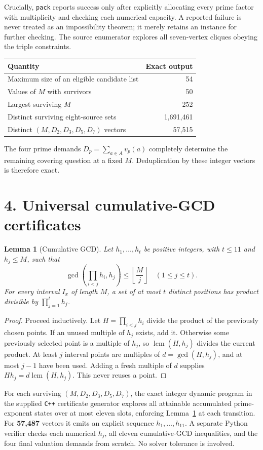 \documentclass[11pt,a4paper]{article}
\newtheorem{lemma}[theorem]{Lemma}
\newcommand{\val}{v}
\newcommand{\GG}{\operatorname{gcd}}
\begin{document}
Crucially, \texttt{pack} reports success only after explicitly allocating every prime factor with multiplicity and checking each numerical capacity. A reported failure is never treated as an impossibility theorem; it merely retains an instance for further checking. The source enumerator explores all seven-vertex cliques obeying the triple constraints.

\begin{center}\begin{tabular}{lr}\toprule
Quantity & Exact output\\\midrule
Maximum size of an eligible candidate list & 54\\
Values of $M$ with survivors & 50\\
Largest surviving $M$ & 252\\
Distinct surviving eight-source sets & 1,691,461\\
Distinct $(M,D_2,D_3,D_5,D_7)$ vectors & 57,515\\\bottomrule
\end{tabular}\end{center}
The four prime demands $D_p=\sum_{a\in A}\val_p(a)$ completely determine the remaining covering question at a fixed $M$. Deduplication by these integer vectors is therefore exact.

\section*{4. Universal cumulative-GCD certificates}
\begin{lemma}[Cumulative GCD]\label{lem:gcd}
Let $h_1,\ldots,h_t$ be positive integers, with $t\le11$ and $h_j\le M$, such that
\[
 \GG\left(\prod_{i<j}h_i,h_j\right)\le\left\lfloor\frac Mj\right\rfloor
 \quad(1\le j\le t).
\]
For every interval $I_x$ of length $M$, a set of at most $t$ distinct positions has product divisible by $\prod_{j=1}^t h_j$.
\end{lemma}
\begin{proof}
Proceed inductively. Let $H=\prod_{i<j}h_i$ divide the product of the previously chosen points. If an unused multiple of $h_j$ exists, add it. Otherwise some previously selected point is a multiple of $h_j$, so $\operatorname{lcm}(H,h_j)$ divides the current product. At least $j$ interval points are multiples of $d=\GG(H,h_j)$, and at most $j-1$ have been used. Adding a fresh multiple of $d$ supplies $Hh_j=d\operatorname{lcm}(H,h_j)$. This never reuses a point.
\end{proof}
For each surviving $(M,D_2,D_3,D_5,D_7)$, the exact integer dynamic program in the supplied \texttt{C++} certificate generator explores all attainable accumulated prime-exponent states over at most eleven slots, enforcing Lemma~\ref{lem:gcd} at each transition. For \textbf{57,487} vectors it emits an explicit sequence $h_1,\dots,h_{11}$. A separate Python verifier checks each numerical $h_j$, all eleven cumulative-GCD inequalities, and the four final valuation demands from scratch. No solver tolerance is involved.
\end{document}
